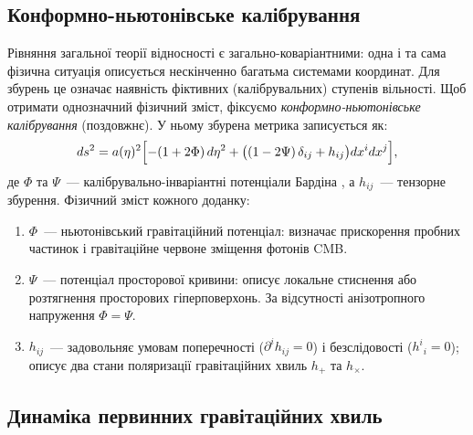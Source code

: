\documentclass[12pt, a4paper]{article}
\begin{document}
\subsection{Конформно-ньютонівське калібрування}

Рівняння загальної теорії відносності є загально-коваріантними: одна і та сама фізична
ситуація описується нескінченно багатьма системами координат.
Для збурень це означає наявність фіктивних (калібрувальних)
ступенів вільності. Щоб отримати однозначний фізичний зміст,
фіксуємо \emph{конформно-ньютонівське калібрування} (поздовжнє).
У ньому збурена метрика записується як:
\begin{equation}\label{eq:perturbed_metric}
  ds^2 = a(\eta)^2\Bigl[
    -(1 + 2\Phi)\,d\eta^2
    + \bigl((1 - 2\Psi)\,\delta_{ij} + h_{ij}\bigr)
      dx^i dx^j
  \Bigr],
\end{equation}
де $\Phi$ та $\Psi$~--- калібрувально-інваріантні потенціали
Бардіна \cite{bardeen_1980}, а $h_{ij}$~--- тензорне збурення.
Фізичний зміст кожного доданку:
\begin{enumerate}
  \item $\Phi$~--- ньютонівський гравітаційний потенціал:
        визначає прискорення пробних частинок і гравітаційне
        червоне зміщення фотонів CMB.
  \item $\Psi$~--- потенціал просторової кривини: описує
        локальне стиснення або розтягнення просторових
        гіперповерхонь. За відсутності анізотропного напруження
        $\Phi = \Psi$.
  \item $h_{ij}$~--- задовольняє умовам поперечності
        ($\partial^i h_{ij} = 0$) і безслідовості
        ($h^i{}_i = 0$); описує два стани поляризації
        гравітаційних хвиль $h_+$ та $h_\times$.
\end{enumerate}

\subsection{Динаміка первинних гравітаційних хвиль}
\end{document}
